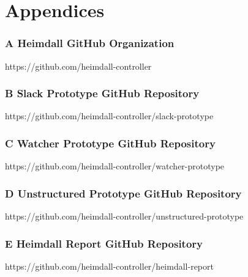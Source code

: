 \documentclass{article}
\begin{document}
\clearpage
\section*{Appendices}
\subsubsection*{A Heimdall GitHub Organization} 
\hypertarget{appendix-a}{https://github.com/heimdall-controller}

\subsubsection*{B Slack Prototype GitHub Repository} 
\hypertarget{appendix-b}{https://github.com/heimdall-controller/slack-prototype}

\subsubsection*{C Watcher Prototype GitHub Repository} 
\hypertarget{appendix-c}{https://github.com/heimdall-controller/watcher-prototype}

\subsubsection*{D Unstructured Prototype GitHub Repository} 
\hypertarget{appendix-d}{https://github.com/heimdall-controller/unstructured-prototype}

\subsubsection*{E Heimdall Report GitHub Repository} \label{appendix-e}
\hypertarget{appendix-e}{https://github.com/heimdall-controller/heimdall-report}
\end{document}
